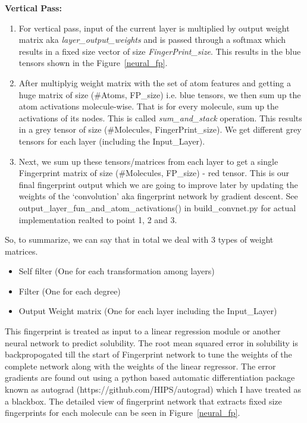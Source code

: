 \documentclass[10pt,a4paper,Times new roman]{report}
\begin{document}
 \textbf{Vertical Pass:}
 \begin{enumerate}
 \item For vertical pass, input of the current layer is multiplied by output weight matrix aka \textit{layer\_output\_weights} and is passed through a softmax which results in a fixed size vector of size \textit{FingerPrint\_size}. This results in the blue tensors shown in the Figure~\ref{neural_fp}.
 
 \item After multiplyig weight matrix with the set of atom features and getting a huge matrix of size (\#Atoms, FP\_size) i.e. blue tensors, we then sum up the atom activations molecule-wise. That is for every molecule, sum up the activations of its nodes. This is called \textit{sum\_and\_stack} operation. This results in a grey tensor of size (\#Molecules, FingerPrint\_size). We get different grey tensors for each layer (including the Input\_Layer).
 
 \item Next, we sum up these tensors/matrices from each layer to get a single Fingerprint matrix of size (\#Molecules, FP\_size) - red tensor. This is our final fingerprint output which we are going to improve later by updating the weights of the `convolution' aka fingerprint network by gradient descent. See output\_layer\_fun\_and\_atom\_activations() in build\_convnet.py for actual implementation realted to point 1, 2 and 3.
 
 \end{enumerate}
 
 So, to summarize, we can say that in total we deal with 3 types of weight matrices.
 
\begin{itemize}
\item Self filter (One for each transformation among layers)
\item Filter (One for each degree)
\item Output Weight matrix (One for each layer including the Input\_Layer)


\end{itemize}


This fingerprint is treated as input to a linear regression module or another neural network to predict solubility. The root mean squared error in solubility is backpropogated till the start of Fingerprint network to tune the weights of the complete network along with the weights of the linear regressor. The error gradients are found out using a python based automatic differentiation package known as autograd (https://github.com/HIPS/autograd) which I have treated as a blackbox. The detailed view of fingerprint network that extracts fixed size fingerprints for each molecule can be seen in Figure~\ref{neural_fp}.
\end{document}
